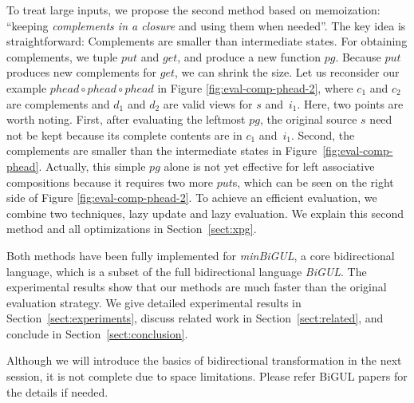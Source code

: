 To treat large inputs, we propose the second method based on memoization: ``keeping \emph{complements in a closure} and using them when needed''. The key idea is straightforward: Complements are smaller
than
intermediate states.
%
%
For obtaining complements, we tuple $put$ and $get$, and produce a new function $pg$. Because $put$ produces new complements for $get$, we can shrink the size.
Let us reconsider our example $phead \circ phead \circ phead$ in Figure \ref{fig:eval-comp-phead-2}, where $c_1$ and $c_2$ are complements and $d_1$ and $d_2$ are valid views for $s$ and~$i_1$. Here, two points are worth noting. First, after evaluating the leftmost $pg$, the original source $s$ need not be kept because its complete contents are in $c_1$ and~$i_1$. Second, the complements are smaller than the intermediate states in Figure~\ref{fig:eval-comp-phead}.
Actually, this simple
$pg$ alone is not yet effective for left associative compositions because it requires two more $put$s, which can be seen on the right side of Figure \ref{fig:eval-comp-phead-2}. To achieve an efficient evaluation, we combine two techniques, lazy update and lazy evaluation. We explain this second method and all optimizations in Section~\ref{sect:xpg}.

Both methods have been fully implemented for \emph{minBiGUL}, a core bidirectional language, which is a subset of the full bidirectional language \emph{BiGUL}. The experimental results show that our methods are much faster than the original evaluation strategy.
We give detailed experimental results in Section~\ref{sect:experiments}, discuss related work in Section~\ref{sect:related}, and conclude in Section~\ref{sect:conclusion}.

Although we will introduce the basics of bidirectional transformation in the next session, it is not complete due to space limitations. Please refer BiGUL papers \cite{Ko:2016:BFV:2847538.2847544, Ko:2017:ABB:3177123.3158129} for the details if needed.


